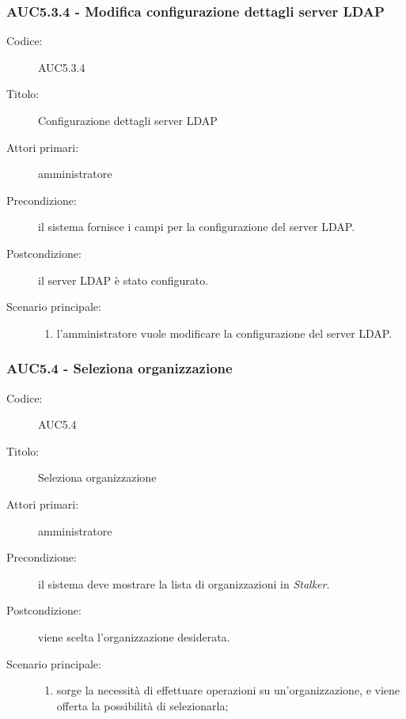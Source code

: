\documentclass[../../../analisi-dei-requisiti.tex]{subfiles}
\begin{document}
\subsubsection{AUC5.3.4 - Modifica configurazione dettagli server LDAP}%
  \label{subsub:AUC5.3.4}
  \begin{description}
    \item[Codice:] AUC5.3.4
    \item[Titolo:] Configurazione dettagli server LDAP
    \item[Attori primari:] amministratore
    \item[Precondizione:] il sistema fornisce i campi per la configurazione del server LDAP.
    \item[Postcondizione:] il server LDAP è stato configurato.
    \item[Scenario principale:]
    \begin{enumerate}
      \item l'amministratore vuole modificare la configurazione del server LDAP.
    \end{enumerate}
  \end{description}

\subsubsection{AUC5.4 - Seleziona organizzazione}%
\label{subsub:AUC5.4}
\begin{description}
  \item[Codice:] AUC5.4
  \item[Titolo:] Seleziona organizzazione
  \item[Attori primari:] amministratore
  \item[Precondizione:] il sistema deve mostrare la lista di organizzazioni in \emph{Stalker}.
  \item[Postcondizione:] viene scelta l'organizzazione desiderata.
  \item[Scenario principale:]
  \begin{enumerate}
    \item sorge la necessità di effettuare operazioni su un'organizzazione, e viene offerta la possibilità di selezionarla;
  \end{enumerate}
\end{description}
\end{document}
